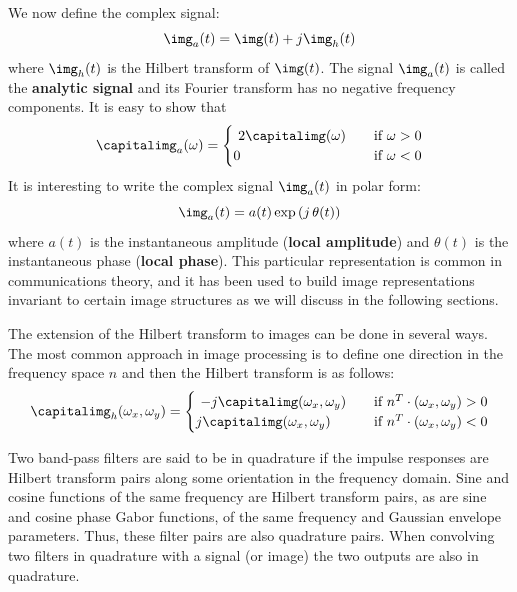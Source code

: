 We now define the complex signal:
\begin{equation}
	\img_a(t) = \img(t) + j \img_h(t)
	\label{eq:analyticsignal}
\end{equation}
where $\img_h(t)$ is the Hilbert transform of $\img(t)$.
The signal $\img_a(t)$ is called the {\bf analytic signal}
and its Fourier transform has no negative frequency components. It is easy to show that
\begin{equation}
	\capitalimg_a(\omega) = \begin{cases}
		~  2\capitalimg(\omega) & \quad \text{if } \omega >0 \\
		0                       & \quad \text{if } \omega <0 \\
	\end{cases}
\end{equation}
It is interesting to write the complex signal $\img_a(t)$ in polar form:
\begin{equation}
	\img_a(t) = a(t) \exp \left( j \, \theta (t) \right)
	\label{eq:analyticsignalpolar}
\end{equation}
where $a(t)$ is the instantaneous amplitude ({\bf local amplitude})
and $\theta (t)$ is the instantaneous phase ({\bf local phase}).
This particular representation is common in communications theory, and it has been used to build image representations invariant to certain image structures as we will discuss in the following sections.

The extension of the Hilbert transform to images can be done in several ways. The most common approach in image processing is to define one direction in the frequency space $n$ and then the Hilbert transform is as follows:
\begin{equation}
	\capitalimg_h(\omega_x,\omega_y) = \begin{cases}
		~  - j \capitalimg(\omega_x,\omega_y) & \quad \text{if } n^T \cdot (\omega_x,\omega_y) > 0 \\
		j \capitalimg(\omega_x,\omega_y)      & \quad \text{if } n^T \cdot (\omega_x,\omega_y) <0  \\
	\end{cases}
\end{equation}

Two band-pass filters are said to be in quadrature if the impulse responses are Hilbert transform pairs along some orientation in the frequency domain.  Sine and cosine functions of the same frequency are Hilbert transform pairs, as are sine and cosine phase Gabor functions, of the same frequency and Gaussian envelope parameters.  Thus, these filter pairs are also quadrature pairs. When convolving two filters in quadrature with a signal (or image) the two outputs are also in quadrature.

